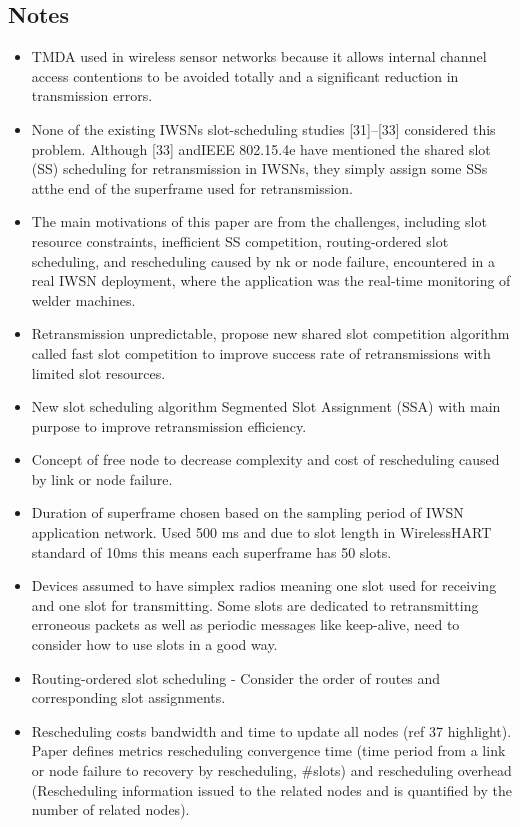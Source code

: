 \documentclass{article}
\begin{document}
\subsection{Notes}
\begin{itemize}
    \item TMDA used in wireless sensor networks because it allows internal channel access contentions to be avoided totally and a significant reduction in transmission errors.
    \item None of the existing IWSNs slot-scheduling studies [31]–[33] considered this problem. Although [33] andIEEE 802.15.4e have mentioned the shared slot (SS) scheduling for retransmission in IWSNs, they simply assign some SSs atthe end of the superframe used for retransmission.
    \item The main motivations of this paper are from the challenges, including slot resource constraints, inefficient SS competition, routing-ordered slot scheduling, and rescheduling caused by nk or node failure, encountered in a real IWSN deployment, where the application was the real-time monitoring of welder machines.
    \item Retransmission unpredictable, propose new shared slot competition algorithm called fast slot competition to improve success rate of retransmissions with limited slot resources.
    \item New slot scheduling algorithm Segmented Slot Assignment (SSA) with main purpose to improve retransmission efficiency.
    \item Concept of free node to decrease complexity and cost of rescheduling caused by link or node failure.
    \item Duration of superframe chosen based on the sampling period of IWSN application network.  Used 500 ms and due to slot length in WirelessHART standard of 10ms this means each superframe has 50 slots.
    \item Devices assumed to have simplex radios meaning one slot used for receiving and one slot for transmitting.  Some slots are dedicated to retransmitting erroneous packets as well as periodic messages like keep-alive, need to consider how to use slots in a good way.
    \item Routing-ordered slot scheduling - Consider the order of routes and corresponding slot assignments.
    \item Rescheduling costs bandwidth and time to update all nodes (ref 37 highlight).  Paper defines metrics rescheduling convergence time (time period from a link or node failure to recovery by rescheduling, #slots) and rescheduling overhead (Rescheduling information issued to the related nodes and is quantified by the number of related nodes).

\end{itemize}
\end{document}
